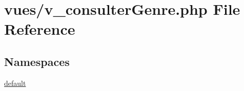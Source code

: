 \hypertarget{v__consulter_genre_8php}{}\section{vues/v\+\_\+consulter\+Genre.php File Reference}
\label{v__consulter_genre_8php}
\subsection*{Namespaces}
\begin{DoxyCompactItemize}
\item 
 \hyperlink{namespacedefault}{default}
\end{DoxyCompactItemize}
